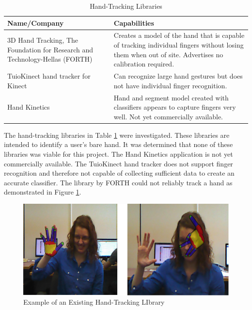\documentclass[12pt]{article}
\begin{document}
\begin{table}[h]
\centering
\caption{Hand-Tracking Libraries}
\label{libraries}
\begin{tabular}{|p{5cm}| p{11cm} |}
\hline
\textbf{Name/Company}                                                                      & \textbf{Capabilities}                                                                                                                                \\ \hline
3D Hand Tracking, The Foundation for Research and Technology-Hellas (FORTH) \cite{FORTH} & Creates a model of the hand that is capable of tracking individual fingers without losing them when out of site. Advertises no calibration required. \\ \hline
TuioKinect hand tracker for Kinect \cite{tuiokinect}                                     & Can recognize large hand gestures but does not have individual finger recognition.                                                                   \\ \hline
Hand Kinetics \cite{handkinetics}                                                        & Hand and segment model created with classifiers appears to capture fingers very well. Not yet commercially available.                                \\ \hline
\end{tabular}
\end{table}

The hand-tracking libraries in Table \ref{libraries} were investigated. These libraries are intended to identify a user’s bare hand. It was determined that none of these libraries was viable for this project. The Hand Kinetics application is not yet commercially available. The TuioKinect hand tracker does not support finger recognition and therefore not capable of collecting sufficient data to create an accurate classifier. The library by FORTH could not reliably track a hand as demonstrated in Figure \ref{forth}. 

\begin{figure}[h!]
  \centering
  \includegraphics[scale=0.8]{FORTH.png}
  \caption{Example of an Existing Hand-Tracking LIbrary}
  \label{forth}
\end{figure}
\end{document}

